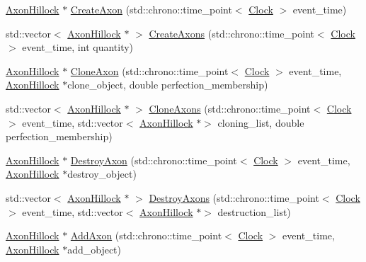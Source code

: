 \begin{DoxyCompactItemize}
\item 
\mbox{\hyperlink{classAxonHillock}{Axon\+Hillock}} $\ast$ \mbox{\hyperlink{classAxonHillock_ae6b18ec6f2921b9d4461b89a9d72ab25}{Create\+Axon}} (std\+::chrono\+::time\+\_\+point$<$ \mbox{\hyperlink{universe_8h_a0ef8d951d1ca5ab3cfaf7ab4c7a6fd80}{Clock}} $>$ event\+\_\+time)
\item 
std\+::vector$<$ \mbox{\hyperlink{classAxonHillock}{Axon\+Hillock}} $\ast$ $>$ \mbox{\hyperlink{classAxonHillock_a15bf1a433f38b8b0c92e4a4efe22ec6f}{Create\+Axons}} (std\+::chrono\+::time\+\_\+point$<$ \mbox{\hyperlink{universe_8h_a0ef8d951d1ca5ab3cfaf7ab4c7a6fd80}{Clock}} $>$ event\+\_\+time, int quantity)
\item 
\mbox{\hyperlink{classAxonHillock}{Axon\+Hillock}} $\ast$ \mbox{\hyperlink{classAxonHillock_ad54833cee03cfcacb5e88d174048aaa4}{Clone\+Axon}} (std\+::chrono\+::time\+\_\+point$<$ \mbox{\hyperlink{universe_8h_a0ef8d951d1ca5ab3cfaf7ab4c7a6fd80}{Clock}} $>$ event\+\_\+time, \mbox{\hyperlink{classAxonHillock}{Axon\+Hillock}} $\ast$clone\+\_\+object, double perfection\+\_\+membership)
\item 
std\+::vector$<$ \mbox{\hyperlink{classAxonHillock}{Axon\+Hillock}} $\ast$ $>$ \mbox{\hyperlink{classAxonHillock_aa65cead56b10bda66dc256c68764a553}{Clone\+Axons}} (std\+::chrono\+::time\+\_\+point$<$ \mbox{\hyperlink{universe_8h_a0ef8d951d1ca5ab3cfaf7ab4c7a6fd80}{Clock}} $>$ event\+\_\+time, std\+::vector$<$ \mbox{\hyperlink{classAxonHillock}{Axon\+Hillock}} $\ast$$>$ cloning\+\_\+list, double perfection\+\_\+membership)
\item 
\mbox{\hyperlink{classAxonHillock}{Axon\+Hillock}} $\ast$ \mbox{\hyperlink{classAxonHillock_a031b2cc7292d023506a5124639a941a7}{Destroy\+Axon}} (std\+::chrono\+::time\+\_\+point$<$ \mbox{\hyperlink{universe_8h_a0ef8d951d1ca5ab3cfaf7ab4c7a6fd80}{Clock}} $>$ event\+\_\+time, \mbox{\hyperlink{classAxonHillock}{Axon\+Hillock}} $\ast$destroy\+\_\+object)
\item 
std\+::vector$<$ \mbox{\hyperlink{classAxonHillock}{Axon\+Hillock}} $\ast$ $>$ \mbox{\hyperlink{classAxonHillock_a083c918c64c60f3cea1d39aa8e0c6fba}{Destroy\+Axons}} (std\+::chrono\+::time\+\_\+point$<$ \mbox{\hyperlink{universe_8h_a0ef8d951d1ca5ab3cfaf7ab4c7a6fd80}{Clock}} $>$ event\+\_\+time, std\+::vector$<$ \mbox{\hyperlink{classAxonHillock}{Axon\+Hillock}} $\ast$$>$ destruction\+\_\+list)
\item 
\mbox{\hyperlink{classAxonHillock}{Axon\+Hillock}} $\ast$ \mbox{\hyperlink{classAxonHillock_a02bfbaea9ea7a160933f8500c8b41d6a}{Add\+Axon}} (std\+::chrono\+::time\+\_\+point$<$ \mbox{\hyperlink{universe_8h_a0ef8d951d1ca5ab3cfaf7ab4c7a6fd80}{Clock}} $>$ event\+\_\+time, \mbox{\hyperlink{classAxonHillock}{Axon\+Hillock}} $\ast$add\+\_\+object)

\end{DoxyCompactItemize}
